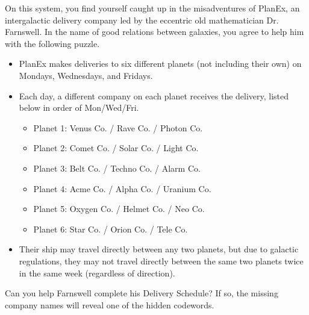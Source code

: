 On this system, you find yourself caught up in the misadventures of
PlanEx, an
intergalactic delivery company led by the eccentric old mathematician
Dr. Farnswell. In the name of good relations between galaxies, you
agree to help him with the following puzzle. 

\begin{itemize}
\item PlanEx makes deliveries
to six different planets (not including their own) on Mondays, Wednesdays,
and Fridays. 
\item Each day, a different company on each planet receives the
delivery, listed below in order of Mon/Wed/Fri.
\begin{itemize}
\item Planet 1: Venus Co. / Rave Co. / Photon Co.
\item Planet 2: Comet Co. / Solar Co. / Light Co.
\item Planet 3: Belt Co. / Techno Co. / Alarm Co.
\item Planet 4: Acme Co. / Alpha Co. / Uranium Co.
\item Planet 5: Oxygen Co. / Helmet Co. / Neo Co.
\item Planet 6: Star Co. / Orion Co. / Tele Co.
\end{itemize}
\item Their ship may travel directly between any two planets,
  but due to galactic regulations, they may not travel directly
  between the same two planets twice in the same week (regardless
  of direction).
\end{itemize}

Can you help Farnswell complete his Delivery Schedule? If so,
the missing company names will reveal one of the hidden codewords. 

\begin{center}
\end{center} 
